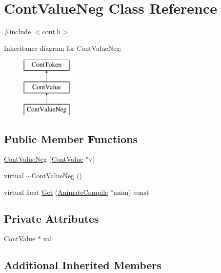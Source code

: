 \hypertarget{a00092}{\section{Cont\-Value\-Neg Class Reference}
\label{a00092}
}


{\ttfamily \#include $<$cont.\-h$>$}

Inheritance diagram for Cont\-Value\-Neg\-:\begin{figure}[H]
\begin{center}
\leavevmode
\includegraphics[height=3.000000cm]{a00092}
\end{center}
\end{figure}
\subsection*{Public Member Functions}
\begin{DoxyCompactItemize}
\item 
\hyperlink{a00092_a7f5e303c5e557bce0dde2d4f6a37b423}{Cont\-Value\-Neg} (\hyperlink{a00086}{Cont\-Value} $\ast$v)
\item 
virtual \hyperlink{a00092_a87fea9fc4b0b4ad724323acc6f70e62c}{$\sim$\-Cont\-Value\-Neg} ()
\item 
virtual float \hyperlink{a00092_abdb5160620bc3c172ed52d34b965257f}{Get} (\hyperlink{a00007}{Animate\-Compile} $\ast$anim) const 
\end{DoxyCompactItemize}
\subsection*{Private Attributes}
\begin{DoxyCompactItemize}
\item 
\hyperlink{a00086}{Cont\-Value} $\ast$ \hyperlink{a00092_a94ee4201663a2287b084ab89b8d642f5}{val}
\end{DoxyCompactItemize}
\subsection*{Additional Inherited Members}


